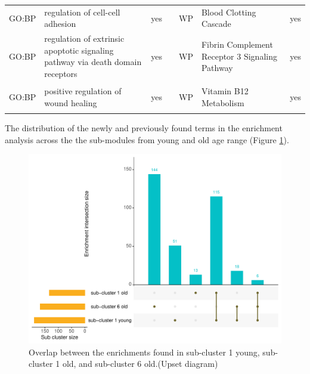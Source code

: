 \begin{longtable}{@{}lp{5cm}lllp{5cm}l@{}}
GO:BP           & regulation of cell-cell adhesion                                                                                                   & yes              &           & WP              & Blood Clotting Cascade                                                                                                                                                 & yes              \\
GO:BP           & regulation of extrinsic apoptotic signaling pathway via death domain receptors          & yes              &           & WP              & Fibrin Complement Receptor 3 Signaling Pathway                                                                                                                         & yes              \\
GO:BP           & positive regulation of wound healing                                                                                               & yes              &           & WP              & Vitamin B12 Metabolism                                                                                                                                                 & yes             

\label{supp:table_c6_enrich}
\end{longtable}


The distribution of the newly and previously found terms in the enrichment analysis across the the sub-modules from young and old age range (Figure \ref{fig:supp_fig_upset_subclusters_enrichments}).

\begin{figure}[ht]
    \includegraphics[width=\textwidth, center]{img/annexe_add_file_GWENA/additional_file_figure_5.pdf}
    \caption{Overlap between the enrichments found in sub-cluster 1 young, sub-cluster 1 old, and sub-cluster 6 old.(Upset diagram)}
    \label{fig:supp_fig_upset_subclusters_enrichments}
\end{figure} 


% 
% 